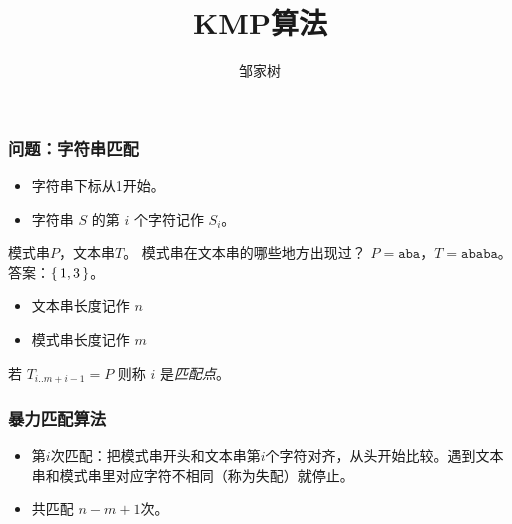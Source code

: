 \documentclass{ctexbeamer}
\newcommand{\str}[1]{\texttt{#1}}
\begin{document}
\title{KMP算法}
\author{邹家树}
\maketitle

\begin{frame}[fragile]
	\frametitle{问题：字符串匹配}

\begin{itemize}
\item 字符串下标从1开始。
\item 字符串 $S$ 的第 $i$ 个字符记作 $S_i$。
\end{itemize}

    模式串$P$，文本串$T$。
    模式串在文本串的哪些地方出现过？
    $P=\str{aba}$，$T=\str{ababa}$。答案：$\set{1, 3}$。

\begin{itemize}
\item 文本串长度记作 $n$
\item 模式串长度记作 $m$
\end{itemize}

若 $T_{i..m+i-1} = P$ 则称 $i$ 是\emph{匹配点}。

\end{frame}


\begin{frame}[fragile]
	\frametitle{暴力匹配算法}

\begin{itemize}
\item 第$i$次匹配：把模式串开头和文本串第$i$个字符对齐，从头开始比较。遇到文本串和模式串里对应字符不相同（称为失配）就停止。
\item 共匹配 $n-m+1$次。
\end{itemize}
\end{frame}
\end{document}
